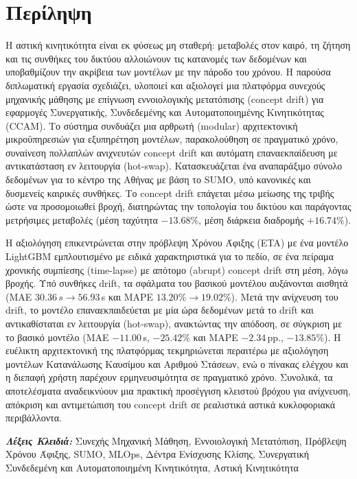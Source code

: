 \chapter*{Περίληψη}

Η αστική κινητικότητα είναι εκ φύσεως μη σταθερή: μεταβολές στον καιρό, τη ζήτηση και τις συνθήκες του δικτύου αλλοιώνουν τις κατανομές των δεδομένων και υποβαθμίζουν την ακρίβεια των μοντέλων με την πάροδο του χρόνου.
Η παρούσα διπλωματική εργασία σχεδιάζει, υλοποιεί και αξιολογεί μια πλατφόρμα συνεχούς μηχανικής μάθησης με επίγνωση εννοιολογικής μετατόπισης (concept drift) για εφαρμογές Συνεργατικής, Συνδεδεμένης και Αυτοματοποιημένης Κινητικότητας (CCAM).
Το σύστημα συνδυάζει μια αρθρωτή (modular) αρχιτεκτονική μικροϋπηρεσιών για εξυπηρέτηση μοντέλων, παρακολούθηση σε πραγματικό χρόνο, συναίνεση πολλαπλών ανιχνευτών concept drift και αυτόματη επαναεκπαίδευση με αντικατάσταση εν λειτουργία (hot-swap).
Κατασκευάζεται ένα αναπαράξιμο σύνολο δεδομένων για το κέντρο της Αθήνας με βάση το SUMO, υπό κανονικές και δυσμενείς καιρικές συνθήκες.
Το concept drift επάγεται μέσω μείωσης της τριβής ώστε να προσομοιωθεί βροχή, διατηρώντας την τοπολογία του δικτύου και παράγοντας μετρήσιμες μεταβολές (μέση ταχύτητα $-13.68\%$, μέση διάρκεια διαδρομής $+16.74\%$).

Η αξιολόγηση επικεντρώνεται στην πρόβλεψη Χρόνου Άφιξης (ETA) με ένα μοντέλο LightGBM εμπλουτισμένο με ειδικά χαρακτηριστικά για το πεδίο, σε ένα πείραμα χρονικής συμπίεσης (time-lapse) με απότομο (abrupt) concept drift στη μέση, λόγω βροχής.
Υπό συνθήκες drift, τα σφάλματα του βασικού μοντέλου αυξάνονται αισθητά (MAE $30.36\,s \rightarrow 56.93$\,s και MAPE $13.20\% \rightarrow 19.02\%$).
Μετά την ανίχνευση του drift, το μοντέλο επαναεκπαιδεύεται με μία ώρα δεδομένων μετά το drift και αντικαθίσταται εν λειτουργία (hot-swap), ανακτώντας την απόδοση, σε σύγκριση με το βασικό μοντέλο (MAE $-11.00$\,s, $-25.42\%$ και MAPE $-2.34$\,pp., $-13.85\%$).
Η ευέλικτη αρχιτεκτονική της πλατφόρμας τεκμηριώνεται περαιτέρω με αξιολόγηση μοντέλων Κατανάλωσης Καυσίμου και Αριθμού Στάσεων, ενώ ο πίνακας ελέγχου και η διεπαφή χρήστη παρέχουν ερμηνευσιμότητα σε πραγματικό χρόνο.
Συνολικά, τα αποτελέσματα αναδεικνύουν μια πρακτική προσέγγιση κλειστού βρόχου για ανίχνευση, απόκριση και αντιμετώπιση του concept drift σε ρεαλιστικά αστικά κυκλοφοριακά περιβάλλοντα.

\textbf{\textit{Λέξεις Κλειδιά:}}
Συνεχής Μηχανική Μάθηση, Εννοιολογική Μετατόπιση, Πρόβλεψη Χρόνου Άφιξης, SUMO, MLOps, Δέντρα Ενίσχυσης Κλίσης, Συνεργατική Συνδεδεμένη και Αυτοματοποιημένη Κινητικότητα, Αστική Κινητικότητα

\cleardoublepage
